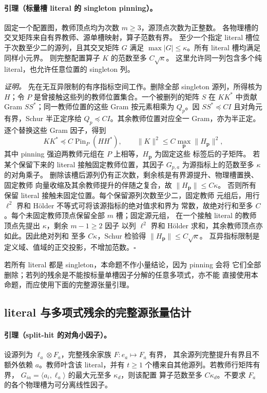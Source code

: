 \documentclass[a4paper]{tufte-handout}
\begin{document}
\begin{fullwidth}
\paragraph{引理（标量槽 literal 的 singleton pinning）。}
\label{fp:core-scalar-literal}
固定一个配置图，教师顶点均为次数 $m\geq3$，源顶点次数为正整数。
各物理槽的交叉矩阵来自有界教师、源单槽映射，算子范数有界。
至少一个指定 literal 槽位于次数至少二的源列，且其交叉矩阵
$G$ 满足 $\max|G|\leq\kappa$。所有 literal 槽均满足同样小元界。
则完整配置算子 $K$ 的范数至多 $C\sqrt\kappa$。
这里允许同一列包含多个纯 literal，也允许任意位置的 singleton 列。

\emph{证明。}
先在无互异限制的有序指标空间工作。删除全部 singleton 源列，所得核为
$H$；令 $P$ 是曾接触这些列的教师位置集合。一个被删列的矩阵 $S$
在 $KK^*$ 中贡献 Gram $SS^*$；同一教师位置的这些 Gram 按元素相乘为
$Q_p$。因 $SS^*\preceq CI$ 且对角元有界，Schur 半正定序给
$Q_p\preceq CI$。其余教师位置对应全一 Gram，亦为半正定。
逐个替换这些 Gram 因子，得到
\[
 KK^*\preceq C\operatorname{Pin}_P(HH^*),\qquad
 \|K\|^2\leq C\max_{\mathbf p}\|H_{\mathbf p}\|^2,
\]
其中 pinning 强迫两教师元组在 $P$ 上相等，$H_{\mathbf p}$ 为固定这些
标签后的子矩阵。
若某个保留下来的 literal 接触固定教师位置，其因子
$G_{p,a}$ 为源指标上的范数至多 $\kappa$ 的对角乘子。
删除该槽后源列仍有正次数，剩余核是有界源提升、物理槽置换、固定教师
向量收缩及其余教师提升的伴随之复合，故 $\|H_{\mathbf p}\|\leq C\kappa$。
否则所有保留 literal 接触未固定位置。每个保留源列次数至少二，固定教师
元组后，用行 $\ell^2$ 界和 H\"older 不等式可将该源指标的绝对值求和界为
常数，故绝对行和至多 $C$。每个未固定教师顶点保留全部 $m$ 槽；固定源元组，
在一个接触 literal 的教师顶点先提出 $\kappa$，剩余 $m-1\geq2$ 因子
以列 $\ell^2$ 界和 H\"older 求和，其余教师顶点亦如此。因此绝对列和
至多 $C\kappa$，Schur 检验得 $\|H_{\mathbf p}\|\leq C\sqrt\kappa$。
互异指标限制是定义域、值域的正交投影，不增加范数。\hfill$\square$

若所有 literal 都是 singleton，本命题不作小量结论，因为 pinning 会将
它们全部删除；若列的残余是不能按标量单槽因子分解的任意多项式，亦不能
直接使用本命题，而应使用下面的完整源张量引理。

\subsection{literal 与多项式残余的完整源张量估计}
\label{fp:core-residual-section}

\paragraph{引理（split-hit 的对角小因子）。}
\label{fp:core-split-hit}
设源列为 $\ell_a\otimes F_a$，完整残余家族 $F:e_a\mapsto F_a$ 有界，
其余源列完整提升有界且不额外依赖 $a$。教师叶含该 literal，并有
$t\geq1$ 个槽来自其他源列。若教师行矩阵有界，
$G_{ia}=\langle a_i,\ell_a\rangle$ 的最大元至多 $\kappa_d$，则该配置
算子范数至多 $C\kappa_d$。不要求 $F_a$ 的各个物理槽为可分离线性因子。


\end{fullwidth}
\end{document}
